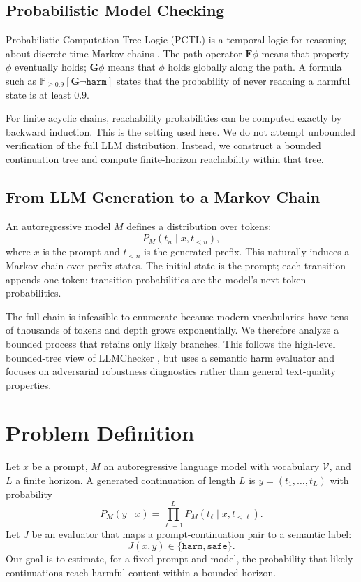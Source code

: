 \documentclass[11pt]{article}
\newcommand{\Prob}{\mathbb{P}}
\newcommand{\calV}{\mathcal{V}}
\newcommand{\harm}{\texttt{harm}}
\newcommand{\safe}{\texttt{safe}}
\begin{document}
\subsection{Probabilistic Model Checking}

Probabilistic Computation Tree Logic (PCTL) is a temporal logic for reasoning about discrete-time Markov chains \cite{hansson1994logic,baier2008principles}.  The path operator $\mathbf{F}\phi$ means that property $\phi$ eventually holds; $\mathbf{G}\phi$ means that $\phi$ holds globally along the path.  A formula such as $\Prob_{\geq 0.9}[\mathbf{G}\neg \harm]$ states that the probability of never reaching a harmful state is at least $0.9$.

For finite acyclic chains, reachability probabilities can be computed exactly by backward induction.  This is the setting used here.  We do not attempt unbounded verification of the full LLM distribution.  Instead, we construct a bounded continuation tree and compute finite-horizon reachability within that tree.

\subsection{From LLM Generation to a Markov Chain}

An autoregressive model $M$ defines a distribution over tokens:
\[
  P_M(t_n \mid x,t_{<n}),
\]
where $x$ is the prompt and $t_{<n}$ is the generated prefix.  This naturally induces a Markov chain over prefix states.  The initial state is the prompt; each transition appends one token; transition probabilities are the model's next-token probabilities.

The full chain is infeasible to enumerate because modern vocabularies have tens of thousands of tokens and depth grows exponentially.  We therefore analyze a bounded process that retains only likely branches.  This follows the high-level bounded-tree view of LLMChecker \cite{gross2025llmchecker}, but uses a semantic harm evaluator and focuses on adversarial robustness diagnostics rather than general text-quality properties.

\section{Problem Definition}
\label{sec:problem}

Let $x$ be a prompt, $M$ an autoregressive language model with vocabulary $\calV$, and $L$ a finite horizon.  A generated continuation of length $L$ is $y = (t_1,\ldots,t_L)$ with probability
\[
  P_M(y\mid x)
  =
  \prod_{\ell=1}^{L}
  P_M(t_\ell \mid x,t_{<\ell}).
\]
Let $J$ be an evaluator that maps a prompt-continuation pair to a semantic label:
\[
  J(x,y) \in \{\harm,\safe\}.
\]
Our goal is to estimate, for a fixed prompt and model, the probability that likely continuations reach harmful content within a bounded horizon.
\end{document}
